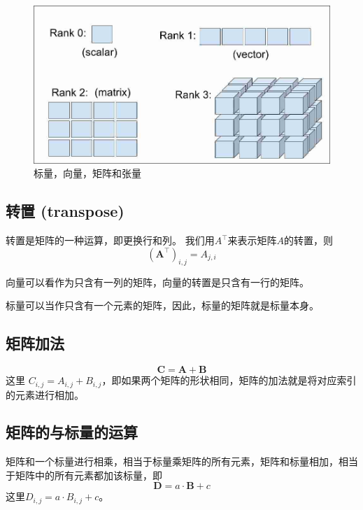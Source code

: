 \begin{figure}[!ht]
  \centering
  \includegraphics[width=\textwidth]{svmt.jpeg}
  \caption{标量，向量，矩阵和张量}
  \label{fig:svmt}
\end{figure}

\subsection{转置 (transpose)}

转置是矩阵的一种运算，即更换行和列。
我们用$A^\top$来表示矩阵$A$的转置，则
\begin{equation}
  (\bm{A}^\top)_{i,j} = A_{j,i}
\end{equation}


向量可以看作为只含有一列的矩阵，向量的转置是只含有一行的矩阵。

标量可以当作只含有一个元素的矩阵，因此，标量的矩阵就是标量本身。


\subsection{矩阵加法}

\begin{equation}
  \bm{C = A + B}
\end{equation}
这里 $C_{i,j} = A_{i,j} + B_{i,j}$，即如果两个矩阵的形状相同，矩阵的加法就是将对应索引的元素进行相加。


\subsection{矩阵的与标量的运算}

矩阵和一个标量进行相乘，相当于标量乘矩阵的所有元素，矩阵和标量相加，相当于矩阵中的所有元素都加该标量，即
\begin{equation}
  \bm{D} = a \cdot \bm{B} + c
\end{equation}
这里$D_{i,j} = a \cdot B_{i,j} + c$。

